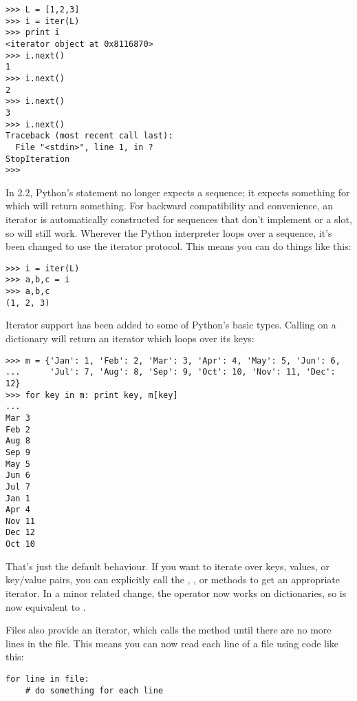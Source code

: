 \documentclass{howto}
\begin{document}
\begin{verbatim}
>>> L = [1,2,3]
>>> i = iter(L)
>>> print i
<iterator object at 0x8116870>
>>> i.next()
1
>>> i.next()
2
>>> i.next()
3
>>> i.next()
Traceback (most recent call last):
  File "<stdin>", line 1, in ?
StopIteration
>>>      
\end{verbatim}

In 2.2, Python's  statement no longer expects a sequence;
it expects something for which  will return something.
For backward compatibility and convenience, an iterator is
automatically constructed for sequences that don't implement
 or a  slot, so  will still work.  Wherever the Python interpreter loops over
a sequence, it's been changed to use the iterator protocol.  This
means you can do things like this:

\begin{verbatim}
>>> i = iter(L)
>>> a,b,c = i
>>> a,b,c
(1, 2, 3)
\end{verbatim}

Iterator support has been added to some of Python's basic types.  
Calling  on a dictionary will return an iterator
which loops over its keys:

\begin{verbatim}
>>> m = {'Jan': 1, 'Feb': 2, 'Mar': 3, 'Apr': 4, 'May': 5, 'Jun': 6,
...      'Jul': 7, 'Aug': 8, 'Sep': 9, 'Oct': 10, 'Nov': 11, 'Dec': 12}
>>> for key in m: print key, m[key]
...
Mar 3
Feb 2
Aug 8
Sep 9
May 5
Jun 6
Jul 7
Jan 1
Apr 4
Nov 11
Dec 12
Oct 10
\end{verbatim}          

That's just the default behaviour.  If you want to iterate over keys,
values, or key/value pairs, you can explicitly call the
, , or 
methods to get an appropriate iterator.  In a minor related change,
the  operator now works on dictionaries, so
 is now equivalent to
.

Files also provide an iterator, which calls the 
method until there are no more lines in the file.  This means you can
now read each line of a file using code like this:

\begin{verbatim}
for line in file:
    # do something for each line
\end{verbatim}
\end{document}
